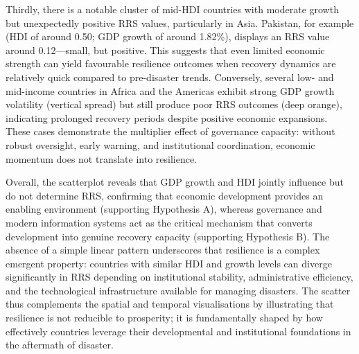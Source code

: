 \documentclass[conference]{IEEEtran}
\begin{document}
Thirdly, there is a notable cluster of mid-HDI countries with moderate growth but unexpectedly positive RRS values, particularly in Asia. Pakistan, for example (HDI of around 0.50; GDP growth of around 1.82\%), displays an RRS value around 0.12—small, but positive. This suggests that even limited economic strength can yield favourable resilience outcomes when recovery dynamics are relatively quick compared to pre-disaster trends. Conversely, several low- and mid-income countries in Africa and the Americas exhibit strong GDP growth volatility (vertical spread) but still produce poor RRS outcomes (deep orange), indicating prolonged recovery periods despite positive economic expansions. These cases demonstrate the multiplier effect of governance capacity: without robust oversight, early warning, and institutional coordination, economic momentum does not translate into resilience.

Overall, the scatterplot reveals that GDP growth and HDI jointly influence but do not determine RRS, confirming that economic development provides an enabling environment (supporting Hypothesis A), whereas governance and modern information systems act as the critical mechanism that converts development into genuine recovery capacity (supporting Hypothesis B). The absence of a simple linear pattern underscores that resilience is a complex emergent property: countries with similar HDI and growth levels can diverge significantly in RRS depending on institutional stability, administrative efficiency, and the technological infrastructure available for managing disasters. The scatter thus complements the spatial and temporal visualisations by illustrating that resilience is not reducible to prosperity; it is fundamentally shaped by how effectively countries leverage their developmental and institutional foundations in the aftermath of disaster.
\end{document}

